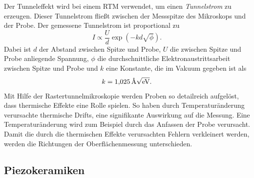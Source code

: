 Der Tunneleffekt wird bei einem RTM verwendet, um einen \emph{Tunnelstrom} zu erzeugen. Dieser Tunnelstrom
fließt zwischen der Messspitze des Mikroskops und der Probe.
Der gemessene Tunnelstrom ist proportional zu %
\begin{equation}
  \label{eq: tunnelstrom}
I\propto \frac{U}{d}\exp{(-kd\sqrt{\phi}) }.
\end{equation}
Dabei ist $d$ der Abstand zwischen Spitze und Probe, $U$ die zwischen Spitze und Probe anliegende Spannung,
$\phi$ die durchschnittliche Elektronaustrittsarbeit zwischen Spitze und Probe und $k$ eine Konstante, die im Vakuum gegeben ist als
\begin{equation*}
  k=\SI{1.025}{\per\angstrom\sqrt{\eV}}.
\end{equation*}
Mit Hilfe der Rastertunnelmikroskopie werden Proben so detailreich aufgelöst, dass thermische Effekte eine Rolle spielen. %
So haben durch Temperaturänderung verursachte thermische Drifts, eine signifikante Auswirkung auf die Messung. %
Eine Temperaturänderung wird zum Beispiel durch das Anfassen der Probe verursacht.
Damit die durch die thermischen Effekte verursachten Fehlern verkleinert werden,
werden die Richtungen der Oberflächenmessung unterschieden.

\subsection{Piezokeramiken}

